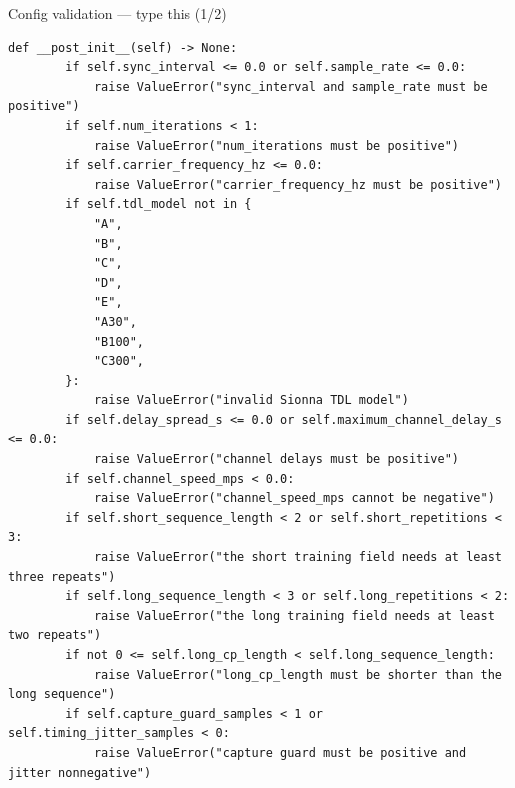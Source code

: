 \documentclass[10pt]{beamer}
\begin{document}
\begin{frame}[fragile]{Config validation --- type this (1/2)}
\begin{lstlisting}[basicstyle=\ttfamily\tiny]
    def __post_init__(self) -> None:
        if self.sync_interval <= 0.0 or self.sample_rate <= 0.0:
            raise ValueError("sync_interval and sample_rate must be positive")
        if self.num_iterations < 1:
            raise ValueError("num_iterations must be positive")
        if self.carrier_frequency_hz <= 0.0:
            raise ValueError("carrier_frequency_hz must be positive")
        if self.tdl_model not in {
            "A",
            "B",
            "C",
            "D",
            "E",
            "A30",
            "B100",
            "C300",
        }:
            raise ValueError("invalid Sionna TDL model")
        if self.delay_spread_s <= 0.0 or self.maximum_channel_delay_s <= 0.0:
            raise ValueError("channel delays must be positive")
        if self.channel_speed_mps < 0.0:
            raise ValueError("channel_speed_mps cannot be negative")
        if self.short_sequence_length < 2 or self.short_repetitions < 3:
            raise ValueError("the short training field needs at least three repeats")
        if self.long_sequence_length < 3 or self.long_repetitions < 2:
            raise ValueError("the long training field needs at least two repeats")
        if not 0 <= self.long_cp_length < self.long_sequence_length:
            raise ValueError("long_cp_length must be shorter than the long sequence")
        if self.capture_guard_samples < 1 or self.timing_jitter_samples < 0:
            raise ValueError("capture guard must be positive and jitter nonnegative")
\end{lstlisting}
\end{frame}
\end{document}
